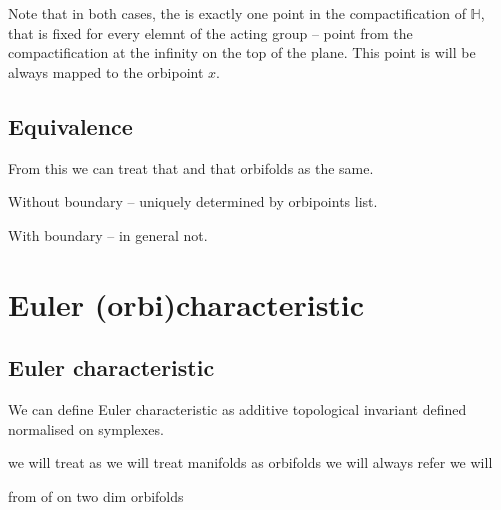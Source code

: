 Note that in both cases, the is exactly one point in the compactification of $\mathbb{H}$, that is 
fixed for every elemnt of the acting group -- point from the compactification at 
the infinity on the top of the plane. This point is will be always mapped to the orbipoint $x$. 


\subsection{Equivalence}\label{sameness}
From this we can treat that and that orbifolds as the same.

Without boundary -- uniquely determined by orbipoints list. 

With boundary -- in general not. 

\section{Euler (orbi)characteristic}\label{E_orb}
\label{\Eoc_as_a_sum}
\subsection{Euler characteristic}
We can define Euler characteristic as additive topological invariant defined 
normalised on symplexes.

we will treat 
as we will treat manifolds as orbifolds we will always refer 
we will 

from of \Eoc on two dim orbifolds\label{\Eoc on 2d}

\subsection{\Eoc}\label{Eoc}


